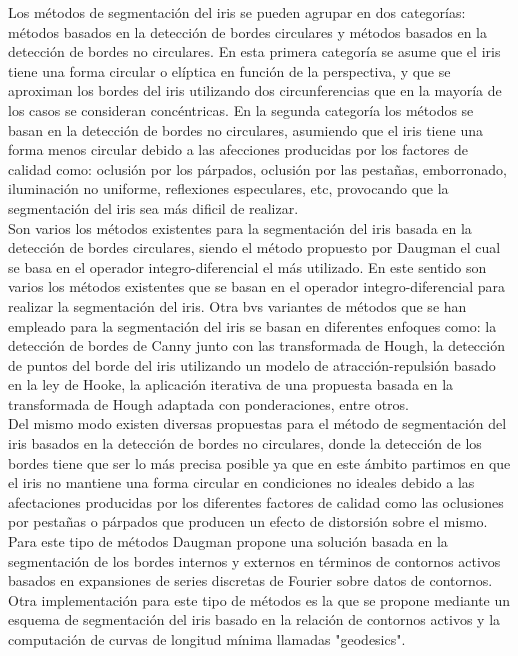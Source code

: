 Los métodos de segmentación del iris se pueden agrupar en dos categorías: métodos basados en la detección de bordes circulares y métodos basados en la detección de bordes no circulares. En esta primera categoría se asume que el iris tiene una forma circular o elíptica en función de la perspectiva, y que se aproximan los bordes del iris utilizando dos circunferencias que en la mayoría de los casos se consideran concéntricas. En la segunda categoría los métodos se basan en la detección de bordes no circulares, asumiendo que el iris tiene una forma menos circular debido a las afecciones producidas por los factores de calidad como: oclusión por los párpados, oclusión por las pestañas, emborronado, iluminación no uniforme, reflexiones especulares, etc, provocando que la segmentación del iris sea más dificil de realizar. \\

Son varios los métodos existentes para la segmentación del iris basada en la detección de bordes circulares, siendo el método propuesto por Daugman el cual se basa en el operador integro-diferencial el más utilizado. En este sentido son varios los métodos existentes que se basan en el operador integro-diferencial para realizar la segmentación del iris. Otra bvs variantes de métodos que se han empleado para la segmentación del iris se basan en diferentes enfoques como: la detección de bordes de Canny junto con las transformada de Hough, la detección de puntos del borde del iris utilizando un modelo de atracción-repulsión basado en la ley de Hooke, la aplicación iterativa de una propuesta basada en la transformada de Hough adaptada con ponderaciones, entre otros. \\

Del mismo modo existen diversas propuestas para el método de segmentación del iris basados en la detección de bordes no circulares, donde la detección de los bordes tiene que ser lo más precisa posible ya que en este ámbito partimos en que el iris no mantiene una forma circular en condiciones no ideales debido a las afectaciones producidas por los diferentes factores de calidad como las oclusiones por pestañas o párpados que producen un efecto de distorsión sobre el mismo. Para este tipo de métodos Daugman propone una solución basada en la segmentación de los bordes internos y externos en términos de contornos activos basados en expansiones de series discretas de Fourier sobre datos de contornos. Otra implementación para este tipo de métodos es la que se propone mediante un esquema de segmentación del iris basado en la relación de contornos activos y la computación de curvas de longitud mínima llamadas "geodesics". \\



